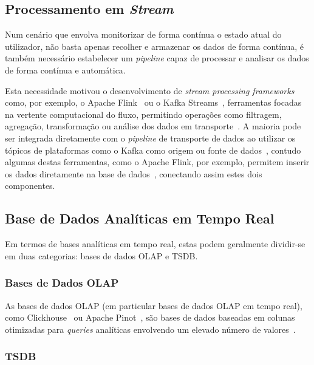 \subsection{Processamento em \textit{Stream}}

Num cenário que envolva monitorizar de forma contínua o estado atual do utilizador, não basta apenas recolher e armazenar os dados de forma contínua, é também necessário estabelecer um \textit{pipeline} capaz de processar e analisar os dados de forma contínua e automática.

Esta necessidade motivou o desenvolvimento de \textit{stream processing frameworks} como, por exemplo, o Apache Flink~\cite{Flink_main} ou o Kafka Streams~\cite{Kafka_Streams_main}, ferramentas focadas na vertente computacional do fluxo, permitindo operações como filtragem, agregação, transformação ou análise dos dados em transporte~\cite{ibm_stream_processing}.
A maioria pode ser integrada diretamente com o \textit{pipeline} de transporte de dados ao utilizar os tópicos de plataformas como o Kafka como origem ou fonte de dados~\cite{ibm_stream_processing}, contudo algumas destas ferramentas, como o Apache Flink, por exemplo, permitem inserir os dados diretamente na base de dados~\cite{flink_connectors}, conectando assim estes dois componentes.


\subsection{Base de Dados Analíticas em Tempo Real}\label{sec:technologies_storage}

Em termos de bases analíticas em tempo real, estas podem geralmente dividir-se em duas categorias: bases de dados \ac{OLAP} e \ac{TSDB}.

\subsubsection{Bases de Dados \ac{OLAP}}

As bases de dados \ac{OLAP} (em particular bases de dados \ac{OLAP} em tempo real), como Clickhouse~\cite{ClickHouse_main} ou Apache Pinot~\cite{Pinot_main}, são bases de dados baseadas em colunas otimizadas para \textit{queries} analíticas envolvendo um elevado número de valores~\cite{Brown2026}.

\subsubsection{\ac{TSDB}}

